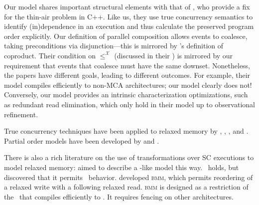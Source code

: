 Our model shares important structural elements with that of
\citet{DBLP:conf/esop/PaviottiCPWOB20}, who provide a fix for the thin-air
problem in C++.  Like us, they use true concurrency semantics to identify
(in)dependence in an execution and thus calculate the preserved program order
explicitly.  Our definition of parallel composition allows events to
coalesce, taking preconditions via disjunction---this is mirrored by
\citeauthor{DBLP:conf/esop/PaviottiCPWOB20}'s definition of coproduct.  Their
condition on $\leq^{\mathcal{X}}$ (discussed in their ) is
mirrored by our requirement that events that coalesce must have the same
downset.  Nonetheless, the papers have different goals, leading to different
outcomes.  For example, their model compiles efficiently to non-MCA
architectures; our model clearly does not!  Conversely, our model provides an
intrinsic characterization optimizations, such as redundant read elimination,
which only hold in their model up to observational refinement.




True concurrency techniques have been applied to relaxed memory by
\citet{DBLP:conf/esop/CenciarelliKS07}, \citet{Castellan},
\citet{Pichon-Pharabod:2016:CSR:2837614.2837616}, and
\citet{DBLP:conf/cgo/ChakrabortyV17}.
Partial order models have been developed by \citet{brookes} and
\citet{DBLP:journals/lmcs/KavanaghB19}.

There is also a rich literature on the use of transformations over SC
executions to model relaxed memory:
%
\citet{Saraswat:2007:TMM:1229428.1229469}
aimed to describe a \jmm-like model this way.  \drfsc\ holds, but \citet{SP} 
discovered that it permits \oota\ behavior.
%
\citet{DBLP:conf/popl/DemangeLZJPV13} developed \textsc{bmm}, which permits
reordering of a relaxed write with a following relaxed read.
\textsc{bmm} is designed as a restriction of the \jmm\ that compiles efficiently to
\tso.  It requires fencing on other architectures.

